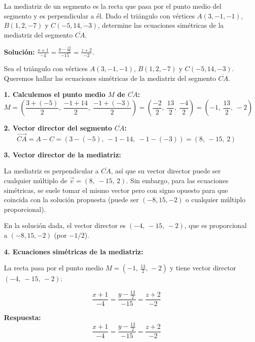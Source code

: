 \begin{prob} La mediatriz de un segmento es la recta que pasa por el punto medio del segmento y es perpendicular a él. Dado el triángulo con vértices $A(3,-1,-1)$, $B(1,2,-7)$ y $C(-5,14,-3)$, determine las ecuaciones simétricas de la mediatriz del segmento $\overline{CA}$. 

\textbf{Solución:} $\frac{x+1}{-4}=\frac{y-\frac{13}{2}}{-15}=\frac{z+2}{-2}$.
\begin{myproof}
Sea el triángulo con vértices $A(3,-1,-1)$, $B(1,2,-7)$ y $C(-5,14,-3)$. Queremos hallar las ecuaciones simétricas de la mediatriz del segmento $\overline{CA}$.

\textbf{1. Calculemos el punto medio $M$ de $\overline{CA}$:}
\[
M = \left( \frac{3 + (-5)}{2},\ \frac{-1 + 14}{2},\ \frac{-1 + (-3)}{2} \right ) = \left( \frac{-2}{2},\ \frac{13}{2},\ \frac{-4}{2} \right ) = (-1,\ \frac{13}{2},\ -2)
\]

\textbf{2. Vector director del segmento $\overline{CA}$:}
\[
\overrightarrow{CA} = A - C = (3 - (-5),\ -1 - 14,\ -1 - (-3)) = (8,\ -15,\ 2)
\]

\textbf{3. Vector director de la mediatriz:}

La mediatriz es perpendicular a $\overline{CA}$, así que su vector director puede ser cualquier múltiplo de $\overrightarrow{v} = (8,\ -15,\ 2)$. Sin embargo, para las ecuaciones simétricas, se suele tomar el mismo vector pero con signo opuesto para que coincida con la solución propuesta (puede ser $(-8,15,-2)$ o cualquier múltiplo proporcional).

En la solución dada, el vector director es $(-4,\ -15,\ -2)$, que es proporcional a $(-8,15,-2)$ (por $-1/2$).

\textbf{4. Ecuaciones simétricas de la mediatriz:}

La recta pasa por el punto medio $M = (-1,\,\frac{13}{2},\,-2)$ y tiene vector director $(-4,\ -15,\ -2)$:

\[
\frac{x+1}{-4} = \frac{y - \frac{13}{2}}{-15} = \frac{z+2}{-2}
\]

\textbf{Respuesta:}
\[
\boxed{
\frac{x+1}{-4} = \frac{y - \frac{13}{2}}{-15} = \frac{z+2}{-2}
}
\]
\end{myproof}

\end{prob}
